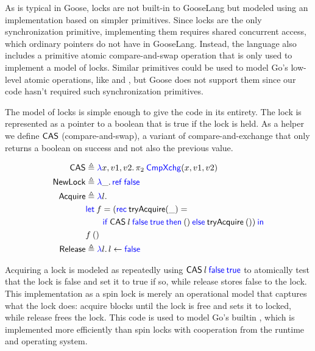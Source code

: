 \newcommand{\Acquire}{\goosedef{Acquire}}
\newcommand{\CAS}{\goosedef{CAS}}

As is typical in Goose, locks are not built-in to GooseLang but modeled
using an implementation based on simpler primitives. Since locks are the
only synchronization primitive, implementing them requires shared
concurrent access, which ordinary pointers do not have in GooseLang.
Instead, the language also includes a primitive atomic compare-and-swap
operation that is only used to implement a model of locks. Similar primitives
could be used to model Go's low-level atomic operations, like
 and , but Goose does not
support them since our code hasn't required such synchronization primitives.

The model of locks is simple enough to give the code in its entirety. The lock
is represented as a pointer to a boolean that is true if the lock is held. As a
helper we define $\CAS$ (compare-and-swap), a variant of compare-and-exchange
that only returns a boolean on success and not also the previous value.

\begin{align*}
  \CAS &\defeq \gooselambda{x, v1, v2} \pi_{2}\app \goosekw{CmpXchg}(x, v1, v2) \\
  \goosedef{NewLock} & \defeq \gooselambda{\_} \goosekw{ref} \app \goosekw{false} \\
  \Acquire &\defeq \gooselambda{l} \\
       &\goosekw{let}\app f = (\goosekw{rec}\: \textlog{tryAcquire}(\_) = \\
       &\qquad \gooseif{\CAS \app l \app \goosekw{false} \app \goosekw{true}}%
         {()}{\textlog{tryAcquire} \app ()}) \app\goosekw{in} \\
       &f \app () \\
  \goosedef{Release} &\defeq \gooselambda{l} l \gets \goosekw{false} \\
\end{align*}

Acquiring a lock is modeled as repeatedly using
$\CAS \app l \app \goosekw{false} \app \goosekw{true}$ to
atomically test that the lock is false and set it to true if so, while release
stores false to the lock. This implementation as a spin lock is merely an
operational model that captures what the lock does: acquire blocks until the
lock is free and sets it to locked, while release frees the lock. This code is
used to model Go's builtin , which is implemented more
efficiently than spin locks with cooperation from the runtime and operating
system.

